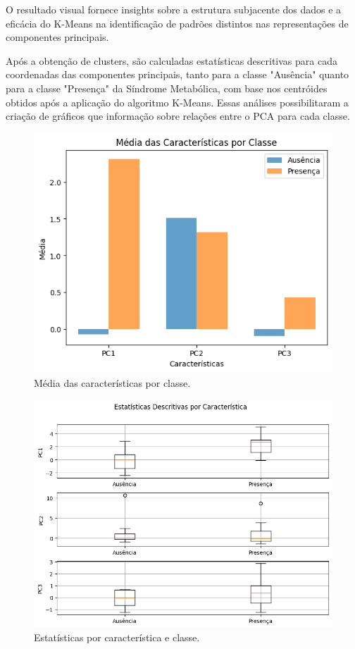 \documentclass[12pt, a4paper]{article}
\begin{document}
\par O resultado visual fornece insights sobre a estrutura subjacente dos dados e a eficácia do K-Means na identificação de padrões distintos nas representações de componentes principais. \\

\par Após a obtenção de clusters, são calculadas estatísticas descritivas para cada coordenadas das componentes principais, tanto para a classe "Ausência" quanto para a classe "Presença" da Síndrome Metabólica, com base nos centróides obtidos após a aplicação do algoritmo K-Means. Essas análises possibilitaram a criação de gráficos que informação sobre relações entre o PCA para cada classe.

\begin{figure}[htbp]
    \centering
    \includegraphics[scale=0.5]{img/k_media.png}
    \caption{Média das características por classe.}
\end{figure}
\begin{figure}[htbp]
    \centering
    \includegraphics[scale=0.4]{img/est_carac.png}
    \caption{Estatísticas por característica e classe.}
\end{figure}
\break
\end{document}
